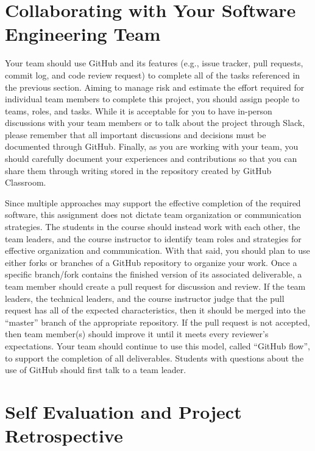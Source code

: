 \documentclass[11pt]{article}
\begin{document}
\section*{Collaborating with Your Software Engineering Team}

Your team should use GitHub and its features (e.g., issue tracker, pull
requests, commit log, and code review request) to complete all of the tasks
referenced in the previous section.
%
Aiming to manage risk and estimate the effort required for individual team
members to complete this project, you should assign people to teams, roles, and
tasks. While it is acceptable for you to have in-person discussions with your
team members or to talk about the project through Slack, please remember that
all important discussions and decisions must be documented through GitHub.
Finally, as you are working with your team, you should carefully document your
experiences and contributions so that you can share them through writing stored
in the repository created by GitHub Classroom.

Since multiple approaches may support the effective completion of the required
software, this assignment does not dictate team organization or communication
strategies. The students in the course should instead work with each other, the
team leaders, and the course instructor to identify team roles and strategies
for effective organization and communication. With that said, you should plan to
use either forks or branches of a GitHub repository to organize your work.
%
Once a specific branch/fork contains the finished version of its associated
deliverable, a team member should create a pull request for discussion and
review. If the team leaders, the technical leaders, and the course instructor
judge that the pull request has all of the expected characteristics, then it
should be merged into the ``master'' branch of the appropriate repository. If
the pull request is not accepted, then team member(s) should improve it until it
meets every reviewer's expectations. Your team should continue to use this
model, called ``GitHub flow'', to support the completion of all deliverables.
%
Students with questions about the use of GitHub should first talk to a team
leader.

\section*{Self Evaluation and Project Retrospective}

\end{document}
